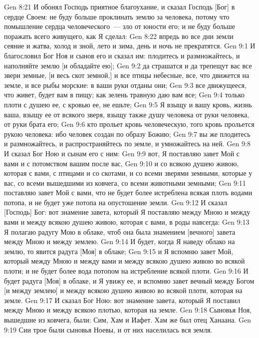 \vs Gen 8:21 И обонял Господь приятное благоухание, и сказал Господь [Бог] в сердце Своем: не буду больше проклинать землю за человека, потому что помышление сердца человеческого~--- зло от юности его; и не буду больше поражать всего живущего, как Я сделал:
\vs Gen 8:22 впредь во все дни земли сеяние и жатва, холод и зной, лето и зима, день и ночь не прекратятся.
\vs Gen 9:1 И благословил Бог Ноя и сынов его и сказал им: плодитесь и размножайтесь, и наполняйте землю [и обладайте ею];
\vs Gen 9:2 да страшатся и да трепещут вас все звери земные, [и весь скот земной,] и все птицы небесные, все, что движется на земле, и все рыбы морские: в ваши руки отданы они;
\vs Gen 9:3 все движущееся, что живет, будет вам в пищу; как зелень травную даю вам все;
\vs Gen 9:4 только плоти с душею ее, с кровью ее, не ешьте;
\vs Gen 9:5 Я взыщу и вашу кровь,  жизнь ваша, взыщу ее от всякого зверя, взыщу также душу человека от руки человека, от руки брата его;
\vs Gen 9:6 кто прольет кровь человеческую, того кровь прольется рукою человека: ибо человек создан по образу Божию;
\vs Gen 9:7 вы же плодитесь и размножайтесь, и распространяйтесь по земле, и умножайтесь на ней.
\rsbpar\vs Gen 9:8 И сказал Бог Ною и сынам его с ним:
\vs Gen 9:9 вот, Я поставляю завет Мой с вами и с потомством вашим после вас,
\vs Gen 9:10 и со всякою душею живою, которая с вами, с птицами и со скотами, и со всеми зверями земными, которые у вас, со всеми вышедшими из ковчега, со всеми животными земными;
\vs Gen 9:11 поставляю завет Мой с вами, что не будет более истреблена всякая плоть водами потопа, и не будет уже потопа на опустошение земли.
\vs Gen 9:12 И сказал [Господь] Бог: вот знамение завета, который Я поставляю между Мною и между вами и между всякою душею живою, которая с вами, в роды навсегда:
\vs Gen 9:13 Я полагаю радугу Мою в облаке, чтоб она была знамением [вечного] завета между Мною и между землею.
\vs Gen 9:14 И будет, когда Я наведу облако на землю, то явится радуга [Моя] в облаке;
\vs Gen 9:15 и Я вспомню завет Мой, который между Мною и между вами и между всякою душею живою во всякой плоти; и не будет более вода потопом на истребление всякой плоти.
\vs Gen 9:16 И будет радуга [Моя] в облаке, и Я увижу ее, и вспомню завет вечный между Богом [и между землею] и между всякою душею живою во всякой плоти, которая на земле.
\vs Gen 9:17 И сказал Бог Ною: вот знамение завета, который Я поставил между Мною и между всякою плотью, которая на земле.
\rsbpar\vs Gen 9:18 Сыновья Ноя, вышедшие из ковчега, были: Сим, Хам и Иафет. Хам же был отец Ханаана.
\vs Gen 9:19 Сии трое были сыновья Ноевы, и от них населилась вся земля.
